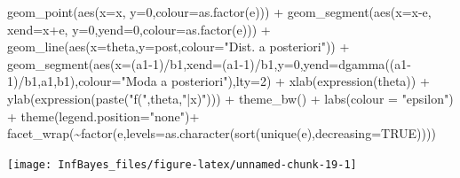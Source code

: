 \documentclass[
]{book}
\newenvironment{Shaded}{\begin{snugshade}}{\end{snugshade}}
\newcommand{\AttributeTok}[1]{\textcolor[rgb]{0.77,0.63,0.00}{#1}}
\newcommand{\ConstantTok}[1]{\textcolor[rgb]{0.00,0.00,0.00}{#1}}
\newcommand{\DecValTok}[1]{\textcolor[rgb]{0.00,0.00,0.81}{#1}}
\newcommand{\FunctionTok}[1]{\textcolor[rgb]{0.00,0.00,0.00}{#1}}
\newcommand{\NormalTok}[1]{#1}
\newcommand{\SpecialCharTok}[1]{\textcolor[rgb]{0.00,0.00,0.00}{#1}}
\newcommand{\StringTok}[1]{\textcolor[rgb]{0.31,0.60,0.02}{#1}}
\begin{document}
\begin{Shaded}
\begin{Highlighting}[]
  \FunctionTok{geom\_point}\NormalTok{(}\FunctionTok{aes}\NormalTok{(}\AttributeTok{x=}\NormalTok{x, }\AttributeTok{y=}\DecValTok{0}\NormalTok{,}\AttributeTok{colour=}\FunctionTok{as.factor}\NormalTok{(e))) }\SpecialCharTok{+}
  \FunctionTok{geom\_segment}\NormalTok{(}\FunctionTok{aes}\NormalTok{(}\AttributeTok{x=}\NormalTok{x}\SpecialCharTok{{-}}\NormalTok{e, }\AttributeTok{xend=}\NormalTok{x}\SpecialCharTok{+}\NormalTok{e, }\AttributeTok{y=}\DecValTok{0}\NormalTok{,}\AttributeTok{yend=}\DecValTok{0}\NormalTok{,}\AttributeTok{colour=}\FunctionTok{as.factor}\NormalTok{(e))) }\SpecialCharTok{+}
  \FunctionTok{geom\_line}\NormalTok{(}\FunctionTok{aes}\NormalTok{(}\AttributeTok{x=}\NormalTok{theta,}\AttributeTok{y=}\NormalTok{post,}\AttributeTok{colour=}\StringTok{"Dist. a posteriori"}\NormalTok{)) }\SpecialCharTok{+}
  \FunctionTok{geom\_segment}\NormalTok{(}\FunctionTok{aes}\NormalTok{(}\AttributeTok{x=}\NormalTok{(a1}\DecValTok{{-}1}\NormalTok{)}\SpecialCharTok{/}\NormalTok{b1,}\AttributeTok{xend=}\NormalTok{(a1}\DecValTok{{-}1}\NormalTok{)}\SpecialCharTok{/}\NormalTok{b1,}\AttributeTok{y=}\DecValTok{0}\NormalTok{,}\AttributeTok{yend=}\FunctionTok{dgamma}\NormalTok{((a1}\DecValTok{{-}1}\NormalTok{)}\SpecialCharTok{/}\NormalTok{b1,a1,b1),}\AttributeTok{colour=}\StringTok{"Moda a posteriori"}\NormalTok{),}\AttributeTok{lty=}\DecValTok{2}\NormalTok{) }\SpecialCharTok{+}
  \FunctionTok{xlab}\NormalTok{(}\FunctionTok{expression}\NormalTok{(theta)) }\SpecialCharTok{+} \FunctionTok{ylab}\NormalTok{(}\FunctionTok{expression}\NormalTok{(}\FunctionTok{paste}\NormalTok{(}\StringTok{"f("}\NormalTok{,theta,}\StringTok{"|x)"}\NormalTok{))) }\SpecialCharTok{+}
  \FunctionTok{theme\_bw}\NormalTok{() }\SpecialCharTok{+} \FunctionTok{labs}\NormalTok{(}\AttributeTok{colour =} \StringTok{"epsilon"}\NormalTok{) }\SpecialCharTok{+} \FunctionTok{theme}\NormalTok{(}\AttributeTok{legend.position=}\StringTok{"none"}\NormalTok{)}\SpecialCharTok{+}
  \FunctionTok{facet\_wrap}\NormalTok{(}\SpecialCharTok{\textasciitilde{}}\FunctionTok{factor}\NormalTok{(e,}\AttributeTok{levels=}\FunctionTok{as.character}\NormalTok{(}\FunctionTok{sort}\NormalTok{(}\FunctionTok{unique}\NormalTok{(e),}\AttributeTok{decreasing=}\ConstantTok{TRUE}\NormalTok{))))}
\end{Highlighting}
\end{Shaded}

\begin{center}\texttt{[image: InfBayes\_files/figure-latex/unnamed-chunk-19-1]} \end{center}
\end{document}
